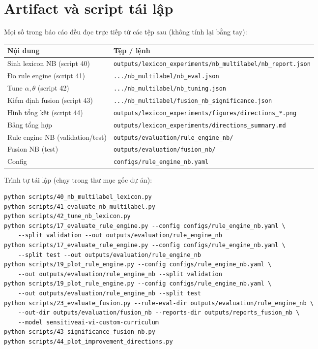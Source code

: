 \documentclass[11pt,a4paper]{article}
\newcommand{\code}[1]{\texttt{\small #1}}
\begin{document}
\appendix
\section{Artifact và script tái lập}
\label{app:artifacts}

Mọi số trong báo cáo đều đọc trực tiếp từ các tệp sau (không tính lại bằng tay):

\begin{table}[H]
  \centering
  \small
  \begin{tabular}{ll}
    \toprule
    Nội dung & Tệp / lệnh \\
    \midrule
    Sinh lexicon NB (script 40)        & \code{outputs/lexicon\_experiments/nb\_multilabel/nb\_report.json} \\
    Đo rule engine (script 41)         & \code{.../nb\_multilabel/nb\_eval.json} \\
    Tune $\alpha,\theta$ (script 42)   & \code{.../nb\_multilabel/nb\_tuning.json} \\
    Kiểm định fusion (script 43)       & \code{.../nb\_multilabel/fusion\_nb\_significance.json} \\
    Hình tổng kết (script 44)          & \code{outputs/lexicon\_experiments/figures/directions\_*.png} \\
    Bảng tổng hợp                      & \code{outputs/lexicon\_experiments/directions\_summary.md} \\
    Rule engine NB (validation/test)   & \code{outputs/evaluation/rule\_engine\_nb/} \\
    Fusion NB (test)                   & \code{outputs/evaluation/fusion\_nb/} \\
    Config                             & \code{configs/rule\_engine\_nb.yaml} \\
    \bottomrule
  \end{tabular}
\end{table}

\noindent
Trình tự tái lập (chạy trong thư mục gốc dự án):
{\small
\begin{verbatim}
python scripts/40_nb_multilabel_lexicon.py
python scripts/41_evaluate_nb_multilabel.py
python scripts/42_tune_nb_lexicon.py
python scripts/17_evaluate_rule_engine.py --config configs/rule_engine_nb.yaml \
    --split validation --out outputs/evaluation/rule_engine_nb
python scripts/17_evaluate_rule_engine.py --config configs/rule_engine_nb.yaml \
    --split test --out outputs/evaluation/rule_engine_nb
python scripts/19_plot_rule_engine.py --config configs/rule_engine_nb.yaml \
    --out outputs/evaluation/rule_engine_nb --split validation
python scripts/19_plot_rule_engine.py --config configs/rule_engine_nb.yaml \
    --out outputs/evaluation/rule_engine_nb --split test
python scripts/23_evaluate_fusion.py --rule-eval-dir outputs/evaluation/rule_engine_nb \
    --out-dir outputs/evaluation/fusion_nb --reports-dir outputs/reports_fusion_nb \
    --model sensitiveai-vi-custom-curriculum
python scripts/43_significance_fusion_nb.py
python scripts/44_plot_improvement_directions.py
\end{verbatim}
}
\end{document}
